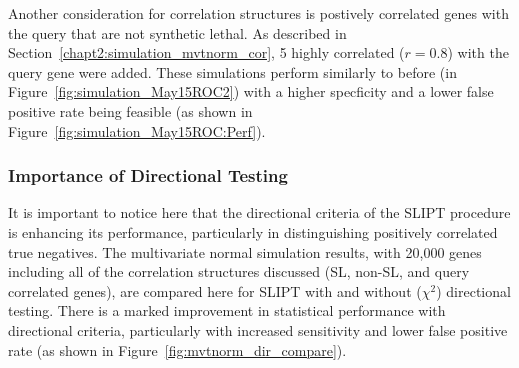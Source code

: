 Another consideration for correlation structures is postively correlated genes with the query that are not \gls{synthetic lethal}. As described in Section~\ref{chapt2:simulation_mvtnorm_cor}, 5 highly correlated ($r = 0.8$) with the query gene were added. These simulations perform similarly to before (in Figure~\ref{fig:simulation_May15ROC2}) with a higher specficity and a lower false positive rate being feasible (as shown in Figure~\ref{fig:simulation_May15ROC:Perf}).


\iffalse
\begin{figure*}[!htbp]
  \begin{center}
  \resizebox{0.5 \textwidth}{!}{
  \fbox{
    \texttt{[image: \{"SL\_Model\_Test\_Graph\_10K\_Graph1\_ROC\_Compare\_Mvtn(Apry)\_v\_Cor(Mayxy)\_Full"]}}
   }
   }
   \end{center}
   \caption[Comparison of performance for query correlations]{\small \textbf{Comparison of performance for query correlations.} Multivariate simulation of \glspl{synthetic lethal} with correlation structure (in colour) clearly has lower performance than simulation including query correlations (in greyscale) across parameters. The query correlation simulation shows predictive potential for \gls{SLIPT} even with many underlying \gls{synthetic lethal} partners as postively correlated genes are distinguished robustly.}
\label{fig:mvtnorm_query_cor_compare}
\end{figure*}
\fi

\FloatBarrier

\subsubsection{Importance of Directional Testing}
It is important to notice here that the directional criteria of the \gls{SLIPT} procedure is enhancing its performance, particularly in distinguishing positively correlated true negatives. The multivariate normal simulation results, with 20,000 genes including all of the correlation structures discussed (SL, non-SL, and query correlated genes), are compared here for \gls{SLIPT} with and without ($\chi^2$) directional testing. There is a marked improvement in statistical performance with directional criteria, particularly with increased sensitivity and lower false positive rate (as shown in Figure~\ref{fig:mvtnorm_dir_compare}).

